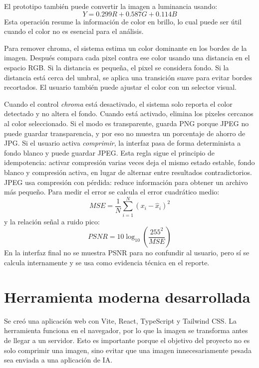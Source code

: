 \documentclass[12pt,letterpaper]{article}
\begin{document}
El prototipo también puede convertir la imagen a luminancia usando:
\[
Y = 0.299R + 0.587G + 0.114B
\]
Esta operación resume la información de color en brillo, lo cual puede ser útil cuando el color no es esencial para el análisis.

Para remover chroma, el sistema estima un color dominante en los bordes de la imagen. Después compara cada pixel contra ese color usando una distancia en el espacio RGB. Si la distancia es pequeña, el pixel se considera fondo. Si la distancia está cerca del umbral, se aplica una transición suave para evitar bordes recortados. El usuario también puede ajustar el color con un selector visual.

Cuando el control \textit{chroma} está desactivado, el sistema solo reporta el color detectado y no altera el fondo. Cuando está activado, elimina los pixeles cercanos al color seleccionado. Si el modo es transparente, guarda PNG porque JPEG no puede guardar transparencia, y por eso no muestra un porcentaje de ahorro de JPG. Si el usuario activa \textit{comprimir}, la interfaz pasa de forma determinista a fondo blanco y puede guardar JPEG. Esta regla sigue el principio de idempotencia: activar compresión varias veces deja el mismo estado estable, fondo blanco y compresión activa, en lugar de alternar entre resultados contradictorios. JPEG usa compresión con pérdida: reduce información para obtener un archivo más pequeño. Para medir el error se calcula el error cuadrático medio:
\[
MSE = \frac{1}{N}\sum_{i=1}^{N}(x_i-\hat{x}_i)^2
\]
y la relación señal a ruido pico:
\[
PSNR = 10\log_{10}\left(\frac{255^2}{MSE}\right)
\]
En la interfaz final no se muestra PSNR para no confundir al usuario, pero sí se calcula internamente y se usa como evidencia técnica en el reporte.

\section{Herramienta moderna desarrollada}
Se creó una aplicación web con Vite, React, TypeScript y Tailwind CSS. La herramienta funciona en el navegador, por lo que la imagen se transforma antes de llegar a un servidor. Esto es importante porque el objetivo del proyecto no es solo comprimir una imagen, sino evitar que una imagen innecesariamente pesada sea enviada a una aplicación de IA.
\end{document}
